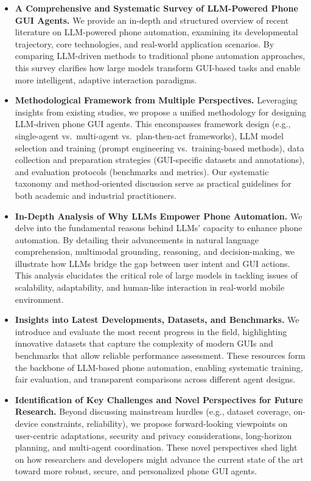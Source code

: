 \begin{itemize}
    \item \textbf{A Comprehensive and Systematic Survey of LLM-Powered Phone GUI Agents.} 
    We provide an in-depth and structured overview of recent literature on LLM-powered phone automation, examining its developmental trajectory, core technologies, and real-world application scenarios. By comparing LLM-driven methods to traditional phone automation approaches, this survey clarifies how large models transform GUI-based tasks and enable more intelligent, adaptive interaction paradigms.

    \item \textbf{Methodological Framework from Multiple Perspectives.} 
    Leveraging insights from existing studies, we propose a unified methodology for designing LLM-driven phone GUI agents. This encompasses framework design (e.g., single-agent vs.\ multi-agent vs.\ plan-then-act frameworks), LLM model selection and training (prompt engineering vs.\ training-based methods), data collection and preparation strategies (GUI-specific datasets and annotations), and evaluation protocols (benchmarks and metrics). Our systematic taxonomy and method-oriented discussion serve as practical guidelines for both academic and industrial practitioners.

    \item \textbf{In-Depth Analysis of Why LLMs Empower Phone Automation.}
    We delve into the fundamental reasons behind LLMs' capacity to enhance phone automation. By detailing their advancements in natural language comprehension, multimodal grounding, reasoning, and decision-making, we illustrate how LLMs bridge the gap between user intent and GUI actions. This analysis elucidates the critical role of large models in tackling issues of scalability, adaptability, and human-like interaction in real-world mobile environment.

    \item \textbf{Insights into Latest Developments, Datasets, and Benchmarks.}
    We introduce and evaluate the most recent progress in the field, highlighting innovative datasets that capture the complexity of modern GUIs and benchmarks that allow reliable performance assessment. These resources form the backbone of LLM-based phone automation, enabling systematic training, fair evaluation, and transparent comparisons across different agent designs.

    \item \textbf{Identification of Key Challenges and Novel Perspectives for Future Research.} 
    Beyond discussing mainstream hurdles (e.g., dataset coverage, on-device constraints, reliability), we propose forward-looking viewpoints on user-centric adaptations, security and privacy considerations, long-horizon planning, and multi-agent coordination. These novel perspectives shed light on how researchers and developers might advance the current state of the art toward more robust, secure, and personalized phone GUI agents.
\end{itemize}

